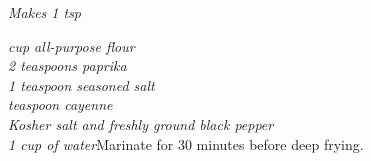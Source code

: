\begin{minipage}{\linewidth}
\end{minipage}\par\begin{minipage}{\linewidth} 
\textit{Makes 1 tsp}\\

\end{minipage}\par\begin{minipage}{\linewidth} 
\textit{ cup all-purpose flour
\\ 2 teaspoons paprika 
\\ 1 teaspoon seasoned salt 
\\  teaspoon cayenne 
\\ Kosher salt and freshly ground black pepper
\\ 1 cup of water}{Marinate for 30 minutes before deep frying.}

\end{minipage}
